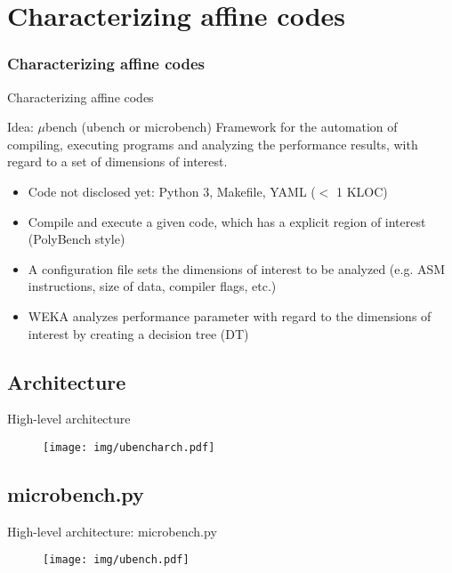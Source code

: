 \documentclass[xcolor=table,hideothersubsections,aspectratio=1610]{beamer}
\begin{document}
\section{Characterizing affine codes}
\frametitle{Characterizing affine codes}
\begin{frame}{Characterizing affine codes}
    \begin{block}{Idea: $\mu$bench (ubench or microbench)}
        Framework for the automation of compiling, executing programs and analyzing the performance results, with regard to a set of dimensions of interest.
    \end{block}

    \begin{itemize}
        \item Code not disclosed yet: Python 3, Makefile, YAML ($<$ 1 KLOC)
        \item Compile and execute a given code, which has a explicit region of interest (PolyBench style)
        \item A configuration file sets the dimensions of interest to be analyzed (e.g. ASM instructions, size of data, compiler flags, etc.)
        \item WEKA analyzes performance parameter with regard to the dimensions of interest by creating a decision tree (DT)
    \end{itemize}

\end{frame}

\subsection{Architecture}
\begin{frame}{High-level architecture}
    \begin{figure}
        \centering
        \texttt{[image: img/ubencharch.pdf]}
    \end{figure}
\end{frame}

\subsection{microbench.py}
\begin{frame}{High-level architecture: microbench.py}
    \begin{figure}
        \centering
        \texttt{[image: img/ubench.pdf]}
    \end{figure}
\end{frame}
\end{document}
